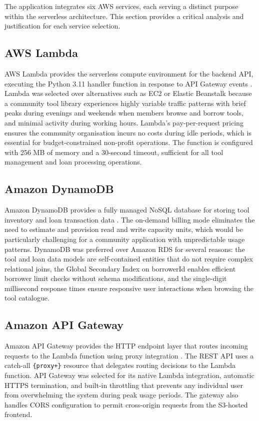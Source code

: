 \documentclass[conference]{IEEEtran}
\begin{document}
The application integrates six AWS services, each serving a distinct purpose within the serverless architecture. This section provides a critical analysis and justification for each service selection.

\subsection{AWS Lambda}

AWS Lambda provides the serverless compute environment for the backend API, executing the Python 3.11 handler function in response to API Gateway events \cite{awslambda}. Lambda was selected over alternatives such as EC2 or Elastic Beanstalk because a community tool library experiences highly variable traffic patterns with brief peaks during evenings and weekends when members browse and borrow tools, and minimal activity during working hours. Lambda's pay-per-request pricing ensures the community organisation incurs no costs during idle periods, which is essential for budget-constrained non-profit operations. The function is configured with 256 MB of memory and a 30-second timeout, sufficient for all tool management and loan processing operations.

\subsection{Amazon DynamoDB}

Amazon DynamoDB provides a fully managed NoSQL database for storing tool inventory and loan transaction data \cite{awsdynamodb}. The on-demand billing mode eliminates the need to estimate and provision read and write capacity units, which would be particularly challenging for a community application with unpredictable usage patterns. DynamoDB was preferred over Amazon RDS for several reasons: the tool and loan data models are self-contained entities that do not require complex relational joins, the Global Secondary Index on borrowerId enables efficient borrower limit checks without schema modifications, and the single-digit millisecond response times ensure responsive user interactions when browsing the tool catalogue.

\subsection{Amazon API Gateway}

Amazon API Gateway provides the HTTP endpoint layer that routes incoming requests to the Lambda function using proxy integration \cite{awsapigateway}. The REST API uses a catch-all \texttt{\{proxy+\}} resource that delegates routing decisions to the Lambda function. API Gateway was selected for its native Lambda integration, automatic HTTPS termination, and built-in throttling that prevents any individual user from overwhelming the system during peak usage periods. The gateway also handles CORS configuration to permit cross-origin requests from the S3-hosted frontend.
\end{document}
